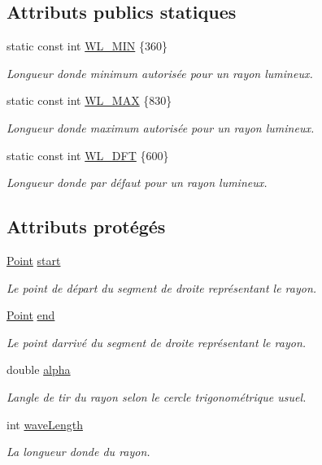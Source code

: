 \subsection*{Attributs publics statiques}
\begin{DoxyCompactItemize}
\item 
static const int \hyperlink{classRay_a478177dabc9f1a3a0ba7d8b388a58b7e}{W\+L\+\_\+\+M\+I\+N} \{360\}
\begin{DoxyCompactList}\small\item\em Longueur d\textquotesingle{}onde minimum autorisée pour un rayon lumineux. \end{DoxyCompactList}\item 
static const int \hyperlink{classRay_add278b4978966f54e3c22e8be2224b7f}{W\+L\+\_\+\+M\+A\+X} \{830\}
\begin{DoxyCompactList}\small\item\em Longueur d\textquotesingle{}onde maximum autorisée pour un rayon lumineux. \end{DoxyCompactList}\item 
static const int \hyperlink{classRay_af4176c69ef62ea83bf84b40d7e1c5560}{W\+L\+\_\+\+D\+F\+T} \{600\}
\begin{DoxyCompactList}\small\item\em Longueur d\textquotesingle{}onde par défaut pour un rayon lumineux. \end{DoxyCompactList}\end{DoxyCompactItemize}
\subsection*{Attributs protégés}
\begin{DoxyCompactItemize}
\item 
\hyperlink{classPoint}{Point} \hyperlink{classRay_a15f35dc363823ce843f4d87e9e0083b9}{start}
\begin{DoxyCompactList}\small\item\em Le point de départ du segment de droite représentant le rayon. \end{DoxyCompactList}\item 
\hyperlink{classPoint}{Point} \hyperlink{classRay_aceb35dc199d12219c6990ca03627dc43}{end}
\begin{DoxyCompactList}\small\item\em Le point d\textquotesingle{}arrivé du segment de droite représentant le rayon. \end{DoxyCompactList}\item 
double \hyperlink{classRay_a8660ea53da0f47170387278c127e92ad}{alpha}
\begin{DoxyCompactList}\small\item\em L\textquotesingle{}angle de tir du rayon selon le cercle trigonométrique usuel. \end{DoxyCompactList}\item 
int \hyperlink{classRay_aaa9ec19c151d6ad78d0d0b643b4940df}{wave\+Length}
\begin{DoxyCompactList}\small\item\em La longueur d\textquotesingle{}onde du rayon. \end{DoxyCompactList}\end{DoxyCompactItemize}



